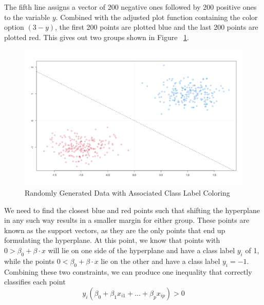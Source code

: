\documentclass[12pt]{article}
\begin{document}
The fifth line assigns a vector of 200 negative ones followed by 200 positive ones to the variable $y$. Combined with the adjusted plot function containing the color option $(3-y)$, the first 200 points are plotted blue and the last 200 points are plotted red. This gives out two groups shown in Figure ~\ref{fig_mmc_hyperplane_w_labels}.
\begin{figure}
    \centering
    \includegraphics[width=5.5in]{Figures/mmc/mmc_hyperplane_w_labels.png}
    \caption{Randomly Generated Data with Associated Class Label Coloring}
    \label{fig_mmc_hyperplane_w_labels}
\end{figure}
We need to find the closest blue and red points such that shifting the hyperplane in any such way results in a smaller margin for either group. These points are known as the support vectors, as they are the only points that end up formulating the hyperplane. At this point, we know that points with $0>\beta_0 + \beta \cdot x$ will lie on one side of the hyperplane and have a class label $y_i$ of 1, while the points $0<\beta_0 + \beta \cdot x$ lie on the other and have a class label $y_i=-1$. Combining these two constraints, we can produce one inequality that correctly classifies each point
$$y_i(\beta_0+\beta_1x_{i1}+...+\beta_px_{ip})>0$$
\end{document}
